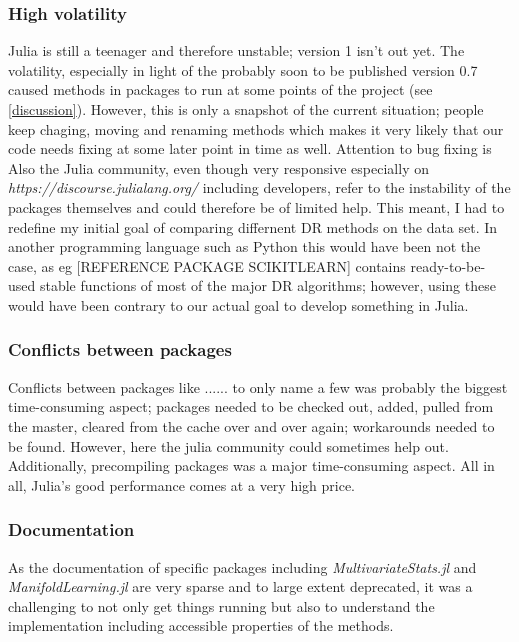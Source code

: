 \documentclass[journal, a4paper]{IEEEtran}
\begin{document}
\subsubsection{High volatility}
Julia is still a teenager and therefore unstable; version 1 isn't out yet. The volatility, especially in light of the probably soon to be published version 0.7
caused methods in packages to run at some points of the project (see \ref{discussion}). %
However, this is only a snapshot of the current situation; people keep chaging, moving and renaming methods which makes it very likely that our code needs fixing at some later point in time as well. Attention to bug fixing is 
Also the Julia community, even though very responsive especially on \textit{https://discourse.julialang.org/} including developers, refer to the instability of the packages themselves and could therefore be of limited help. %
This meant, I had to redefine my initial goal of comparing differnent DR methods on the data set.
In another programming language such as Python this would have been not the case, as eg [REFERENCE PACKAGE SCIKITLEARN] contains ready-to-be-used stable functions of most of the major DR algorithms; however, using these would have been contrary to our actual goal to develop something in Julia.

\subsubsection{Conflicts between packages}
Conflicts between packages like ...... to only name a few was probably the biggest time-consuming aspect; packages needed to be checked out, added, pulled from the master, cleared from the cache over and over again; workarounds needed to be found. 
However, here the julia community could sometimes help out.
Additionally, precompiling packages was a major time-consuming aspect. All in all, Julia's good performance comes at a very high price.

\subsubsection{Documentation}
As the documentation of specific packages including \textit{MultivariateStats.jl} and \textit{ManifoldLearning.jl} are very sparse and to large extent deprecated, it was a challenging to not only get things running but also to understand the implementation including accessible properties of the methods.\\
\end{document}
